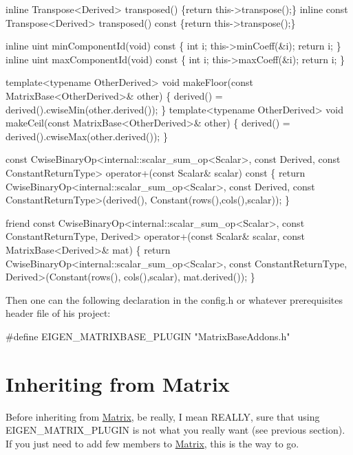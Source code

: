 \begin{DoxyCode}
\textcolor{keyword}{inline} Transpose<Derived> transposed() \{\textcolor{keywordflow}{return} this->transpose();\}
\textcolor{keyword}{inline} \textcolor{keyword}{const} Transpose<Derived> transposed()\textcolor{keyword}{ const }\{\textcolor{keywordflow}{return} this->transpose();\}

\textcolor{keyword}{inline} uint minComponentId(\textcolor{keywordtype}{void})\textcolor{keyword}{ const  }\{ \textcolor{keywordtype}{int} i; this->minCoeff(&i); \textcolor{keywordflow}{return} i; \}
\textcolor{keyword}{inline} uint maxComponentId(\textcolor{keywordtype}{void})\textcolor{keyword}{ const  }\{ \textcolor{keywordtype}{int} i; this->maxCoeff(&i); \textcolor{keywordflow}{return} i; \}

\textcolor{keyword}{template}<\textcolor{keyword}{typename} OtherDerived>
\textcolor{keywordtype}{void} makeFloor(\textcolor{keyword}{const} MatrixBase<OtherDerived>& other) \{ derived() = derived().cwiseMin(other.derived()); \}
\textcolor{keyword}{template}<\textcolor{keyword}{typename} OtherDerived>
\textcolor{keywordtype}{void} makeCeil(\textcolor{keyword}{const} MatrixBase<OtherDerived>& other) \{ derived() = derived().cwiseMax(other.derived()); \}

\textcolor{keyword}{const} CwiseBinaryOp<internal::scalar\_sum\_op<Scalar>, \textcolor{keyword}{const} Derived, \textcolor{keyword}{const} ConstantReturnType>
operator+(\textcolor{keyword}{const} Scalar& scalar)\textcolor{keyword}{ const}
\textcolor{keyword}{}\{ \textcolor{keywordflow}{return} CwiseBinaryOp<internal::scalar\_sum\_op<Scalar>, \textcolor{keyword}{const} Derived, \textcolor{keyword}{const} ConstantReturnType>(derived(),
       Constant(rows(),cols(),scalar)); \}

\textcolor{keyword}{friend} \textcolor{keyword}{const} CwiseBinaryOp<internal::scalar\_sum\_op<Scalar>, \textcolor{keyword}{const} ConstantReturnType, Derived>
operator+(\textcolor{keyword}{const} Scalar& scalar, \textcolor{keyword}{const} MatrixBase<Derived>& mat)
\{ \textcolor{keywordflow}{return} CwiseBinaryOp<internal::scalar\_sum\_op<Scalar>, \textcolor{keyword}{const} ConstantReturnType, Derived>(Constant(rows(),
      cols(),scalar), mat.derived()); \}
\end{DoxyCode}


Then one can the following declaration in the config.\+h or whatever prerequisites header file of his project\+: 
\begin{DoxyCode}
\textcolor{preprocessor}{#define EIGEN\_MATRIXBASE\_PLUGIN "MatrixBaseAddons.h"}
\end{DoxyCode}
 \hypertarget{TopicCustomizing_InheritingMatrix}{}\section{Inheriting from Matrix}\label{TopicCustomizing_InheritingMatrix}
Before inheriting from \hyperlink{group___core___module_class_eigen_1_1_matrix}{Matrix}, be really, I mean R\+E\+A\+L\+LY, sure that using E\+I\+G\+E\+N\+\_\+\+M\+A\+T\+R\+I\+X\+\_\+\+P\+L\+U\+G\+IN is not what you really want (see previous section). If you just need to add few members to \hyperlink{group___core___module_class_eigen_1_1_matrix}{Matrix}, this is the way to go.

